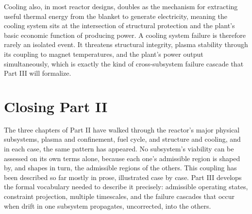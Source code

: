 Cooling also, in most reactor designs, doubles as the mechanism for extracting useful thermal energy from the blanket to generate electricity, meaning the cooling system sits at the intersection of structural protection and the plant's basic economic function of producing power. A cooling system failure is therefore rarely an isolated event. It threatens structural integrity, plasma stability through its coupling to magnet temperatures, and the plant's power output simultaneously, which is exactly the kind of cross-subsystem failure cascade that Part III will formalize.

\section{Closing Part II}

The three chapters of Part II have walked through the reactor's major physical subsystems, plasma and confinement, fuel cycle, and structure and cooling, and in each case, the same pattern has appeared. No subsystem's viability can be assessed on its own terms alone, because each one's admissible region is shaped by, and shapes in turn, the admissible regions of the others. This coupling has been described so far mostly in prose, illustrated case by case. Part III develops the formal vocabulary needed to describe it precisely: admissible operating states, constraint projection, multiple timescales, and the failure cascades that occur when drift in one subsystem propagates, uncorrected, into the others.
